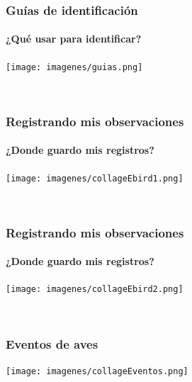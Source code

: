 \documentclass[compress]{beamer}
\begin{document}
{
  \begin{frame}
    \frametitle{Guías de identificación}
    \framesubtitle{¿Qué usar para identificar?}
    \begin{center}
      \texttt{[image: imagenes/guias.png]}\\
      \captionof{}{}
    \end{center}\\[-0.2cm]

   \end{frame}
}

{
  \begin{frame}
    \frametitle{Registrando mis observaciones}
    \framesubtitle{¿Donde guardo mis registros?}
    \begin{center}
      \texttt{[image: imagenes/collageEbird1.png]}\\
      \captionof{}{}
    \end{center}\\[-0.2cm]

   \end{frame}
}


{
  \begin{frame}
    \frametitle{Registrando mis observaciones}
    \framesubtitle{¿Donde guardo mis registros?}
    \begin{center}
      \texttt{[image: imagenes/collageEbird2.png]}\\
      \captionof{}{}
    \end{center}\\[-0.2cm]

   \end{frame}
}




{
  \begin{frame}
    \frametitle{Eventos de aves}
    \begin{center}
      \texttt{[image: imagenes/collageEventos.png]}\\
      \captionof{}{}
    \end{center}\\[-0.2cm]

   \end{frame}
}
\end{document}
